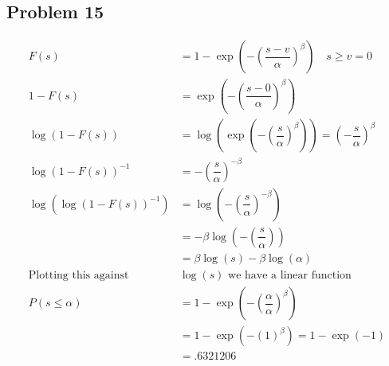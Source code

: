 \documentclass{article}
\begin{document}
\begin{flushleft}
\section*{Problem 15}
\begin{align*}
F(s)&=1-\exp(-(\dfrac{s-v}{\alpha})^{\beta}) \quad s \geq v=0\\
1-F(s)&=\exp(-(\dfrac{s-0}{\alpha})^{\beta})\\
\log(1-F(s))&=\log(\exp(-(\dfrac{s}{\alpha})^{\beta}))=(-\dfrac{s}{\alpha})^{\beta}\\
\log(1-F(s))^{-1}&=-(\dfrac{s}{\alpha})^{-\beta}\\
\log(\log(1-F(s))^{-1})&=\log(-(\dfrac{s}{\alpha})^{-\beta})\\
&=-\beta \log(-(\dfrac{s}{\alpha}))\\
&=\beta\log(s)-\beta\log(\alpha)\\
\text{Plotting this against } &\log(s) \text{ we have a linear function}\\
P(s\leq \alpha)&=1-\exp(-(\dfrac{\alpha}{\alpha})^{\beta})\\
&=1-\exp(-(1)^{\beta})=1-\exp(-1)\\
&=.6321206
\end{align*}

\end{flushleft}
\end{document}
